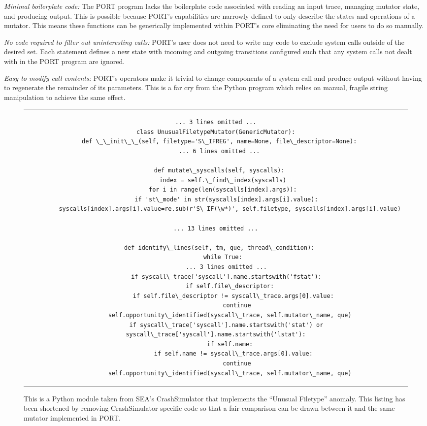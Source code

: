 \textit{Minimal boilerplate code:} The PORT program lacks the boilerplate
code associated with
reading an input trace, managing mutator state, and producing output.
This is possible because PORT's capabilities are narrowly defined to
only describe the states and operations of a mutator.  This means these
functions can be generically implemented within PORT's core eliminating
the need for users to do so manually.

\textit{No code required to filter out uninteresting calls:}
PORT's user does
not need to write any code to exclude system
calls outside of the desired set.  Each statement defines a new state with
incoming and outgoing transitions configured such that any system calls not
dealt with in the PORT program are ignored.

\textit{Easy to modify call contents:}  PORT's operators make it
trivial to change components of a system call
and produce output without having to regenerate the remainder of its
parameters.
This is a far cry
from the Python program which relies on manual, fragile string manipulation
to achieve the same effect.


\begin{figure}[H]
\centering
\begin{tabular}{c}
\begin{lstlisting}
... 3 lines omitted ...
class UnusualFiletypeMutator(GenericMutator):
  def \_\_init\_\_(self, filetype='S\_IFREG', name=None, file\_descriptor=None):
  ... 6 lines omitted ...

  def mutate\_syscalls(self, syscalls):
    index = self.\_find\_index(syscalls)
    for i in range(len(syscalls[index].args)):
      if 'st\_mode' in str(syscalls[index].args[i].value):
        syscalls[index].args[i].value=re.sub(r'S\_IF(\w*)', self.filetype, syscalls[index].args[i].value)

... 13 lines omitted ...

  def identify\_lines(self, tm, que, thread\_condition):
    while True:
      ... 3 lines omitted ...
      if syscall\_trace['syscall'].name.startswith('fstat'):
        if self.file\_descriptor:
          if self.file\_descriptor != syscall\_trace.args[0].value:
            continue
        self.opportunity\_identified(syscall\_trace, self.mutator\_name, que)
      if syscall\_trace['syscall'].name.startswith('stat') or syscall\_trace['syscall'].name.startswith('lstat'):
        if self.name:
          if self.name != syscall\_trace.args[0].value:
            continue
        self.opportunity\_identified(syscall\_trace, self.mutator\_name, que)
\end{lstlisting}
\end{tabular}
\caption{This is a Python module taken from SEA's CrashSimulator that
  implements the ``Unusual Filetype'' anomaly.  This listing has been
  shortened by removing CrashSimulator specific-code so that a fair
  comparison can be drawn between it and the same mutator implemented in
  PORT.}
\label{lst:UnusualFiletypePython}
\end{figure}

